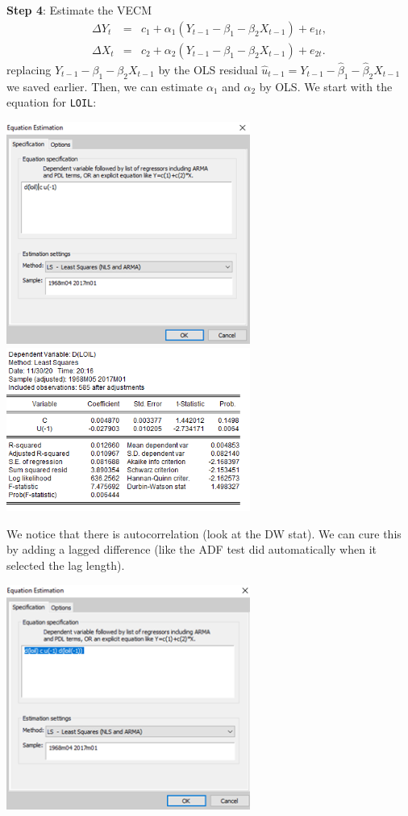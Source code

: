 \documentclass[11pt, a4paper]{article}
\begin{document}
\begin{enumerate}
\begin{enumerate}
\noindent\textbf{Step 4}: Estimate the VECM
\begin{eqnarray*}
\Delta Y_{t} &=&c_1+\alpha _{1}(Y_{t-1}-\beta _{1}-\beta _{2}X_{t-1})+e_{1t}, \\
\Delta X_{t} &=&c_2+\alpha _{2}(Y_{t-1}-\beta _{1}-\beta _{2}X_{t-1})+e_{2t}.
\end{eqnarray*}
replacing $Y_{t-1}-\beta _{1}-\beta _{2}X_{t-1}$
by the OLS residual $\hat{u}_{t-1}=Y_{t-1}-\hat{\beta}_{1}-\hat{\beta}_{2}X_{t-1} $ we saved earlier. Then, we can estimate $\alpha _{1}$ and $\alpha _{2}$ by OLS. We start with the equation for \texttt{LOIL}:
\begin{center}
\includegraphics[width=0.6\textwidth]{vecmeviews}
\includegraphics[width=0.6\textwidth]{vecm0}
\end{center}
We notice that there is autocorrelation (look at the DW stat). We can cure this by adding a lagged difference (like the ADF test did automatically when it selected the lag length).
\begin{center}
\includegraphics[width=0.6\textwidth]{vecmeviews1}

\end{center}
\end{enumerate}
\end{enumerate}
\end{document}
